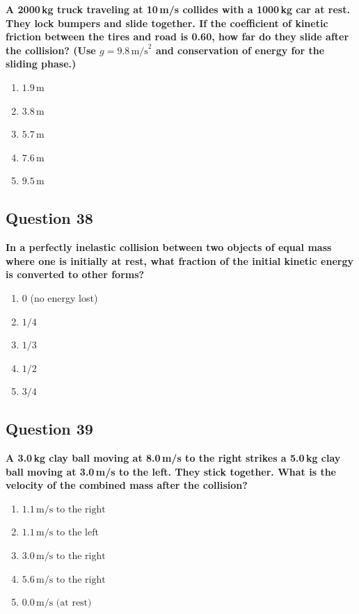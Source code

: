 \documentclass[12pt,letterpaper]{article}
\begin{document}
\begin{questionbox}
\textbf{A 2000\,kg truck traveling at 10\,m/s collides with a 1000\,kg car at rest. They lock bumpers and slide together. If the coefficient of kinetic friction between the tires and road is 0.60, how far do they slide after the collision? (Use $g = 9.8\,\text{m/s}^2$ and conservation of energy for the sliding phase.)}

\begin{enumerate}[label=\alph*)]
    \item $1.9\,\text{m}$
    \item $3.8\,\text{m}$
    \item $5.7\,\text{m}$
    \item $7.6\,\text{m}$
    \item $9.5\,\text{m}$
\end{enumerate}
\end{questionbox}

\subsection{Question 38}

\begin{questionbox}
\textbf{In a perfectly inelastic collision between two objects of equal mass where one is initially at rest, what fraction of the initial kinetic energy is converted to other forms?}

\begin{enumerate}[label=\alph*)]
    \item $0$ (no energy lost)
    \item $1/4$
    \item $1/3$
    \item $1/2$
    \item $3/4$
\end{enumerate}
\end{questionbox}

\subsection{Question 39}

\begin{questionbox}
\textbf{A 3.0\,kg clay ball moving at 8.0\,m/s to the right strikes a 5.0\,kg clay ball moving at 3.0\,m/s to the left. They stick together. What is the velocity of the combined mass after the collision?}

\begin{enumerate}[label=\alph*)]
    \item $1.1\,\text{m/s to the right}$
    \item $1.1\,\text{m/s to the left}$
    \item $3.0\,\text{m/s to the right}$
    \item $5.6\,\text{m/s to the right}$
    \item $0.0\,\text{m/s (at rest)}$
\end{enumerate}
\end{questionbox}
\end{document}
